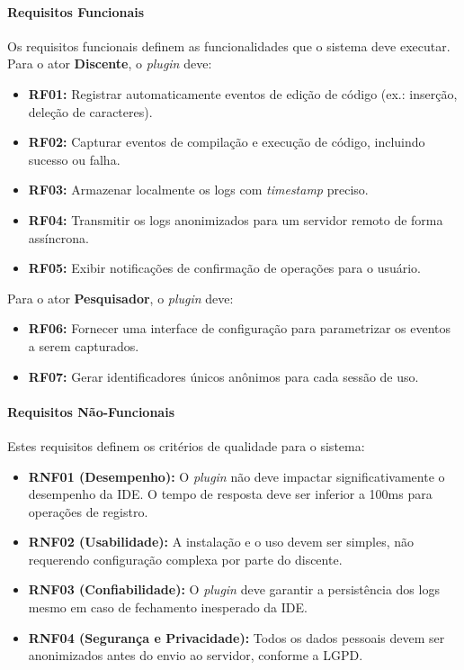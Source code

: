 \paragraph{Requisitos Funcionais}
Os requisitos funcionais definem as funcionalidades que o sistema deve executar. Para o ator \textbf{Discente}, o \textit{plugin} deve:
\begin{itemize}
    \item \textbf{RF01:} Registrar automaticamente eventos de edição de código (ex.: inserção, deleção de caracteres).
    \item \textbf{RF02:} Capturar eventos de compilação e execução de código, incluindo sucesso ou falha.
    \item \textbf{RF03:} Armazenar localmente os logs com \textit{timestamp} preciso.
    \item \textbf{RF04:} Transmitir os logs anonimizados para um servidor remoto de forma assíncrona.
    \item \textbf{RF05:} Exibir notificações de confirmação de operações para o usuário.
\end{itemize}

Para o ator \textbf{Pesquisador}, o \textit{plugin} deve:
\begin{itemize}
    \item \textbf{RF06:} Fornecer uma interface de configuração para parametrizar os eventos a serem capturados.
    \item \textbf{RF07:} Gerar identificadores únicos anônimos para cada sessão de uso.
\end{itemize}

\paragraph{Requisitos Não-Funcionais}
Estes requisitos definem os critérios de qualidade para o sistema:
\begin{itemize}
    \item \textbf{RNF01 (Desempenho):} O \textit{plugin} não deve impactar significativamente o desempenho da IDE. O tempo de resposta deve ser inferior a 100ms para operações de registro.
    \item \textbf{RNF02 (Usabilidade):} A instalação e o uso devem ser simples, não requerendo configuração complexa por parte do discente.
    \item \textbf{RNF03 (Confiabilidade):} O \textit{plugin} deve garantir a persistência dos logs mesmo em caso de fechamento inesperado da IDE.
    \item \textbf{RNF04 (Segurança e Privacidade):} Todos os dados pessoais devem ser anonimizados antes do envio ao servidor, conforme a LGPD.
\end{itemize}

